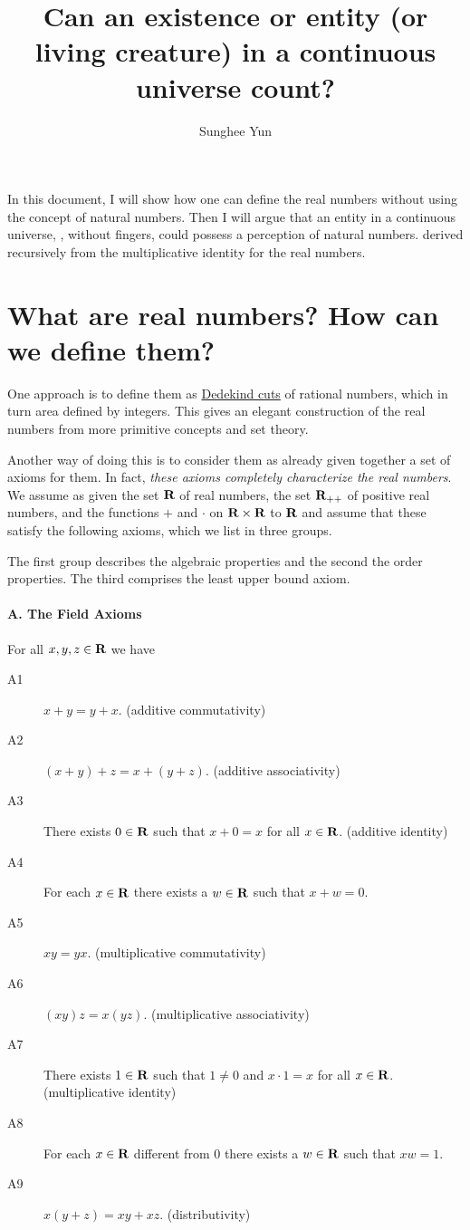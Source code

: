 \documentclass{article}
\title{Can an existence or entity (or living creature) in a continuous universe count?}
\author{Sunghee Yun}
\begin{document}
\maketitle

In this document,
I will show how one can define the real numbers without using the concept of natural numbers.
Then I will argue that an entity in a continuous universe, \eg, without fingers,
could possess a perception of natural numbers.
derived recursively from the multiplicative identity for the real numbers.

\section{What are real numbers? How can we define them?}

One approach is to define them as \href{https://en.wikipedia.org/wiki/Dedekind_cut}{Dedekind cuts}
of rational numbers, which in turn area defined by integers.
This gives an elegant construction of the real numbers from more primitive concepts and set theory.

Another way of doing this is to consider them as already given
together a set of axioms for them.
In fact, \emph{these axioms completely characterize the real numbers}.
We assume as given the set ${\mbox{\bf R}}$ of real numbers,
the set ${{\mbox{\bf R}}_{++}}$ of positive real numbers,
and the functions $+$ and $\cdot$ on ${\mbox{\bf R}}\times{\mbox{\bf R}}$ to ${\mbox{\bf R}}$
and assume that these satisfy the following axioms,
which we list in three groups.

The first group describes the algebraic properties
and the second the order properties.
The third comprises the least upper bound axiom.

\paragraph{A. The Field Axioms}
For all $x,y,z \in{\mbox{\bf R}}$ we have
\begin{description}
\item[A1] $x + y = y + x$. (additive commutativity)
\item[A2] $(x + y) + z = x + (y + z)$. (additive associativity)
\item[A3] There exists $0 \in{\mbox{\bf R}}$ such that $x+0=x$ for all $x\in{\mbox{\bf R}}$. (additive identity)
\item[A4] For each $x\in{\mbox{\bf R}}$ there exists a $w \in {\mbox{\bf R}}$ such that $x+w=0$.
\item[A5] $xy=yx$. (multiplicative commutativity)
\item[A6] $(xy)z=x(yz)$. (multiplicative associativity)
\item[A7] There exists $1 \in{\mbox{\bf R}}$ such that $1\neq0$ and $x\cdot1=x$ for all $x\in{\mbox{\bf R}}$. (multiplicative identity)
\item[A8] For each $x\in{\mbox{\bf R}}$ different from $0$ there exists a $w \in {\mbox{\bf R}}$ such that $xw=1$.
\item[A9] $x(y+z) = xy+xz$. (distributivity)
\end{description}
\end{document}
